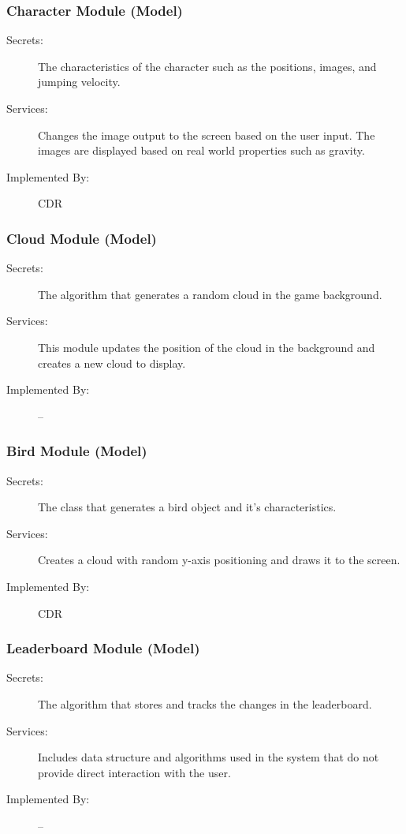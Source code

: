 \documentclass[12pt, titlepage]{article}
\begin{document}
\subsubsection{Character Module (Model)}
\begin{description}
\item[Secrets:] The characteristics of the character such as the positions, images, and jumping velocity. 
\item[Services:] Changes the image output to the screen based on the user input. The images are displayed based on real world properties such as gravity. 
\item[Implemented By:] CDR
\end{description}


\subsubsection{Cloud Module (Model)}
\begin{description}
\item[Secrets:] The algorithm that generates a random cloud in the game background.
\item[Services:] This module updates the position of the cloud in the background and creates a new cloud to display. 
\item[Implemented By:] --
\end{description}



\subsubsection{Bird Module (Model)}
\begin{description}
\item[Secrets:] The class that generates a bird object and it's characteristics. 
\item[Services:] Creates a cloud with random y-axis positioning and draws it to the screen. 
\item[Implemented By:] CDR
\end{description}



\subsubsection{Leaderboard Module (Model)}
\begin{description}
\item[Secrets:] The algorithm that stores and tracks the changes in the leaderboard.
\item[Services:] Includes data structure and algorithms used in the system that do not provide direct interaction with the user. 
\item[Implemented By:] --
\end{description}
\end{document}

